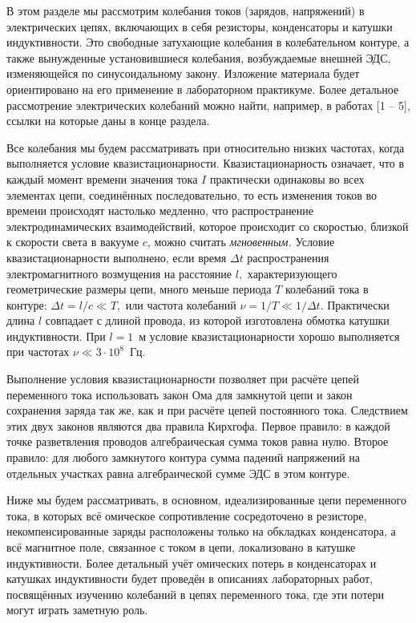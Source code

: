 В этом разделе мы рассмотрим колебания токов (зарядов, напряжений) в электрических цепях, включающих в себя резисторы, конденсаторы и катушки индуктивности. Это \important{--} свободные затухающие колебания в колебательном контуре, а также вынужденные установившиеся колебания, возбуждаемые внешней ЭДС, изменяющейся по синусоидальному закону. Изложение материала будет ориентировано на его применение в лабораторном практикуме. Более детальное рассмотрение электрических колебаний можно найти, например, в работах [1 – 5], ссылки на которые даны в конце раздела.

Все колебания мы будем рассматривать при относительно низких частотах, когда выполняется условие квазистационарности. Квазистационарность означает, что в каждый момент времени значения тока $I$ практически одинаковы во всех элементах цепи, соединённых последовательно, то есть изменения токов во времени происходят настолько медленно, что распространение электродинамических взаимодействий, которое происходит со скоростью, близкой к скорости света в вакууме $c$, можно считать \emph{мгновенным.} Условие квазистационарности выполнено, если время $\Delta t$ распространения электромагнитного возмущения на расстояние $l,$ характеризующего геометрические размеры цепи, много меньше периода $T$ колебаний тока в контуре: $\Delta t=l/c\ll T,$ или частота колебаний $\nu=1/T\ll1/\Delta t.$ Практически длина $l$ совпадает с длиной провода, из которой изготовлена обмотка катушки индуктивности. При $l=1$~м условие квазистационарности хорошо выполняется при частотах $\nu\ll3\cdot10^8$~Гц.

Выполнение условия квазистационарности позволяет при расчёте цепей переменного тока использовать закон Ома для замкнутой цепи и закон сохранения заряда так же, как и при расчёте цепей постоянного тока. Следствием этих двух законов являются два правила Кирхгофа. Первое правило: в каждой точке разветвления проводов алгебраическая сумма токов равна нулю. Второе правило: для любого замкнутого контура сумма падений напряжений на отдельных участках равна алгебраической сумме ЭДС в этом контуре. 

Ниже мы будем рассматривать, в основном, идеализированные цепи переменного тока, в которых всё омическое сопротивление сосредоточено в резисторе, некомпенсированные заряды расположены только на обкладках конденсатора, а всё магнитное поле, связанное с током в цепи, локализовано в катушке индуктивности. Более детальный учёт омических потерь в конденсаторах и катушках индуктивности будет проведён в описаниях лабораторных работ, посвящённых изучению колебаний в цепях переменного тока, где эти потери могут играть заметную роль.

